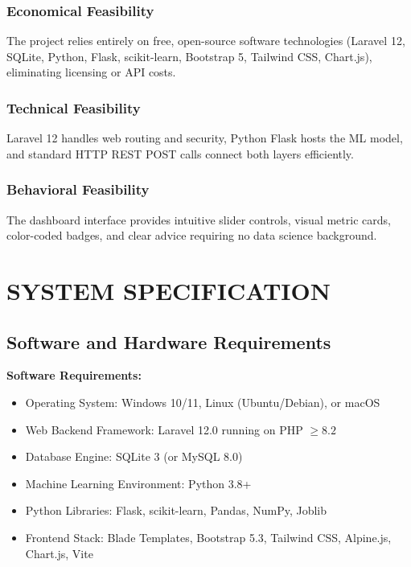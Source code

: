\documentclass[12pt,a4paper]{report}
\begin{document}
\subsection{Economical Feasibility}
The project relies entirely on free, open-source software technologies (Laravel 12, SQLite, Python, Flask, scikit-learn, Bootstrap 5, Tailwind CSS, Chart.js), eliminating licensing or API costs.

\subsection{Technical Feasibility}
Laravel 12 handles web routing and security, Python Flask hosts the ML model, and standard HTTP REST POST calls connect both layers efficiently.

\subsection{Behavioral Feasibility}
The dashboard interface provides intuitive slider controls, visual metric cards, color-coded badges, and clear advice requiring no data science background.

\chapter{SYSTEM SPECIFICATION}

\section{Software and Hardware Requirements}
\textbf{Software Requirements:}
\begin{itemize}
    \item Operating System: Windows 10/11, Linux (Ubuntu/Debian), or macOS
    \item Web Backend Framework: Laravel 12.0 running on PHP $\ge 8.2$
    \item Database Engine: SQLite 3 (or MySQL 8.0)
    \item Machine Learning Environment: Python 3.8+
    \item Python Libraries: Flask, scikit-learn, Pandas, NumPy, Joblib
    \item Frontend Stack: Blade Templates, Bootstrap 5.3, Tailwind CSS, Alpine.js, Chart.js, Vite
\end{itemize}
\end{document}
